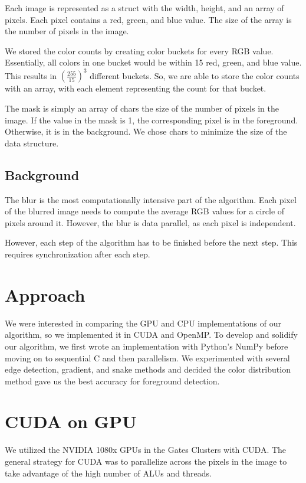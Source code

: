 \documentclass[12pt]{article}
\begin{document}
Each image is represented as a struct with the width, height, and an array of
pixels. Each pixel contains a red, green, and blue value. The size of the array
is the number of pixels in the image.

We stored the color counts by creating color buckets for every RGB value.
Essentially, all colors in one bucket would be within 15 red, green, and blue
value. This results in $\left(\tfrac{255}{15}\right)^3$ different buckets. So,
we are able to store the color counts with an array, with each element
representing the count for that bucket.

The mask is simply an array of chars the size of the number of pixels in the
image. If the value in the mask is 1, the corresponding pixel is in the
foreground. Otherwise, it is in the background. We chose chars to minimize the
size of the data structure.

\subsection{Background}

The blur is the most computationally intensive part of the algorithm. Each
pixel of the blurred image needs to compute the average RGB values for a circle
of pixels around it. However, the blur is data parallel, as each pixel is
independent.

However, each step of the algorithm has to be finished before the next step.
This requires synchronization after each step.

\section{Approach}

We were interested in comparing the GPU and CPU implementations of our
algorithm, so we implemented it in CUDA and OpenMP. To develop and solidify our
algorithm, we first wrote an implementation with Python's NumPy before moving
on to sequential C and then parallelism. We experimented with several edge
detection, gradient, and snake methods and decided the color distribution
method gave us the best accuracy for foreground detection.

\section{CUDA on GPU}

We utilized the NVIDIA 1080x GPUs in the Gates Clusters with CUDA. The general
strategy for CUDA was to parallelize across the pixels in the image to take
advantage of the high number of ALUs and threads.
\end{document}

